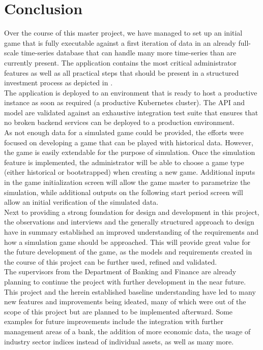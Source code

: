 \section{Conclusion}
\label{sec:conclusion}
Over the course of this master project, we have managed to set up an initial game that is fully executable against a first iteration of data in an already full-scale time-series database that can handle many more time-series than are currently present. The application contains the most critical administrator features as well as all practical steps that should be present in a structured investment process as depicted in . \\

The application is deployed to an environment that is ready to host a productive instance as soon as required (a productive Kubernetes cluster). The API and model are validated against an exhaustive integration test suite that ensures that no broken backend services can be deployed to a production environment. \\

As not enough data for a simulated game could be provided, the efforts were focused on developing a game that can be played with historical data. However, the game is easily extendable for the purpose of simulation. Once the simulation feature is implemented, the administrator will be able to choose a game type (either historical or bootstrapped) when creating a new game. Additional inputs in the game initialization screen will allow the game master to parametrize the simulation, while additional outputs on the following start period screen will allow an initial verification of the simulated data. \\

Next to providing a strong foundation for design and development in this project, the observations and interviews and the generally structured approach to design have in summary established an improved understanding of the requirements and how a simulation game should be approached. This will provide great value for the future development of the game, as the models and requirements created in the course of this project can be further used, refined and validated. \\

The supervisors from the Department of Banking and Finance are already planning to continue the project with further development in the near future. This project and the herein established baseline understanding have led to many new features and improvements being ideated, many of which were out of the scope of this project but are planned to be implemented afterward. Some examples for future improvements include the integration with further management areas of a bank, the addition of more economic data, the usage of industry sector indices instead of individual assets, as well as many more. \\

